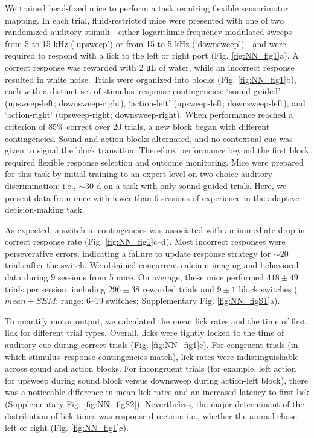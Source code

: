 

We trained head-fixed mice to perform a task requiring flexible sensorimotor mapping. In each trial, fluid-restricted mice were presented with one of two randomized auditory stimuli---either logarithmic frequency-modulated sweeps from 5 to 15 kHz (`upsweep') or from 15 to 5 kHz (`downsweep')---and were required to respond with a lick to the left or right port (Fig. \ref{fig:NN_fig1}a). A correct response was rewarded with 2 \si{\uL} of water, while an incorrect response resulted in white noise. Trials were organized into blocks (Fig. \ref{fig:NN_fig1}b), each with a distinct set of stimulus--response contingencies: `sound-guided' (upsweep-left; downsweep-right), `action-left' (upsweep-left; downsweep-left), and `action-right' (upsweep-right; downsweep-right). When performance reached a criterion of 85\% correct over 20 trials, a new block began with different contingencies. Sound and action blocks alternated, and no contextual cue was given to signal the block transition. Therefore, performance beyond the first block required flexible response selection and outcome monitoring. Mice were prepared for this task by initial training to an expert level on two-choice auditory discrimination; i.e., $\sim 30$ d on a task with only sound-guided trials. Here, we present data from mice with fewer than 6 sessions of experience in the adaptive decision-making task.



As expected, a switch in contingencies was associated with an immediate drop in correct response rate (Fig. \ref{fig:NN_fig1}c--d). Most incorrect responses were perseverative errors, indicating a failure to update response strategy for $\sim 20$ trials after the switch. We obtained concurrent calcium imaging and behavioral data during 9 sessions from 5 mice. On average, these mice performed $418 \pm 49$ trials per session, including $296 \pm 38$ rewarded trials and $9 \pm 1$ block switches ($\mathit{mean}\pm\mathit{SEM}$; range: 6–19 switches; Supplementary Fig. \ref{fig:NN_figS1}a). 

To quantify motor output, we calculated the mean lick rates and the time of first lick for different trial types. Overall, licks were tightly locked to the time of auditory cue during correct trials (Fig. \ref{fig:NN_fig1}e). For congruent trials (in which stimulus--response contingencies match), lick rates were indistinguishable across sound and action blocks. For incongruent trials (for example, left action for upsweep during sound block versus downsweep during action-left block), there was a noticeable difference in mean lick rates and an increased latency to first lick (Supplementary Fig. \ref{fig:NN_figS2}). Nevertheless, the major determinant of the distribution of lick times was response direction: i.e., whether the animal chose left or right (Fig. \ref{fig:NN_fig1}e). 

